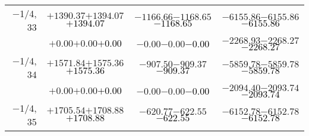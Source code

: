\documentclass[compress]{beamer}
\begin{document}
\begin{frame}
{\begin{tabular}{r | c | c | c}
$-$1/4, 33 & $+1390.37$\hspace{0.1 cm}$+1394.07$\hspace{0.1 cm}\textcolor{black}{$+1394.07$} & $-1166.66$\hspace{0.1 cm}$-1168.65$\hspace{0.1 cm}\textcolor{black}{$-1168.65$} & $-6155.86$\hspace{0.1 cm}$-6155.86$\hspace{0.1 cm}\textcolor{black}{$-6155.86$} \\
           & $+0.00$\hspace{0.1 cm}$+0.00$\hspace{0.1 cm}\textcolor{black}{$+0.00$} & $-0.00$\hspace{0.1 cm}$-0.00$\hspace{0.1 cm}\textcolor{black}{$-0.00$} & $-2268.93$\hspace{0.1 cm}$-2268.27$\hspace{0.1 cm}\textcolor{black}{$-2268.27$} \\
$-$1/4, 34 & $+1571.84$\hspace{0.1 cm}$+1575.36$\hspace{0.1 cm}\textcolor{black}{$+1575.36$} & $-907.50$\hspace{0.1 cm}$-909.37$\hspace{0.1 cm}\textcolor{black}{$-909.37$} & $-5859.78$\hspace{0.1 cm}$-5859.78$\hspace{0.1 cm}\textcolor{black}{$-5859.78$} \\
           & $+0.00$\hspace{0.1 cm}$+0.00$\hspace{0.1 cm}\textcolor{black}{$+0.00$} & $-0.00$\hspace{0.1 cm}$-0.00$\hspace{0.1 cm}\textcolor{black}{$-0.00$} & $-2094.40$\hspace{0.1 cm}$-2093.74$\hspace{0.1 cm}\textcolor{black}{$-2093.74$} \\
$-$1/4, 35 & $+1705.54$\hspace{0.1 cm}$+1708.88$\hspace{0.1 cm}\textcolor{black}{$+1708.88$} & $-620.77$\hspace{0.1 cm}$-622.55$\hspace{0.1 cm}\textcolor{black}{$-622.55$} & $-6152.78$\hspace{0.1 cm}$-6152.78$\hspace{0.1 cm}\textcolor{black}{$-6152.78$} \\

\end{tabular}}
\end{frame}
\end{document}
